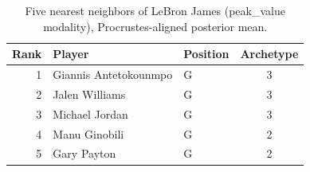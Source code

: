 \begin{table}[htbp]
  \centering\small
  \begin{tabular}{rllc}
    \toprule
    Rank & Player & Position & Archetype \\
    \midrule
    1 & Giannis Antetokounmpo & G & 3 \\
    2 & Jalen Williams & G & 3 \\
    3 & Michael Jordan & G & 3 \\
    4 & Manu Ginobili & G & 2 \\
    5 & Gary Payton & G & 2 \\
    \bottomrule
  \end{tabular}
  \caption{Five nearest neighbors of LeBron James (peak_value modality), Procrustes-aligned posterior mean.}
  \label{tab:LeBron_James_neighbors_peak_value}
\end{table}

